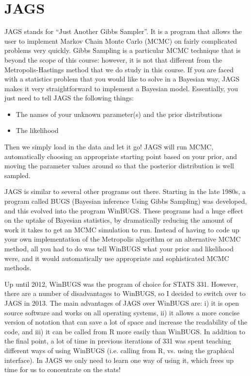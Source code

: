 \chapter{JAGS}
JAGS stands for ``Just Another Gibbs Sampler''. It is a program that allows the user
to implement Markov Chain Monte Carlo (MCMC) on fairly complicated problems
very quickly. Gibbs Sampling is a particular MCMC technique that is beyond the
scope of this course: however, it is not that different from the Metropolis-Hastings
method that we do study in this course. If you are faced with a statistics
problem that you would like to solve in a Bayesian way, JAGS makes it very
straightforward to implement a Bayesian model. Essentially, you just need to tell
JAGS the following things:
\begin{itemize}
\item The names of your unknown parameter(s) and the prior distributions
\item The likelihood
\end{itemize}
Then we simply load in the data and let it go! JAGS will run MCMC, automatically
choosing an appropriate starting point based on your prior, and moving the parameter
values around so that the posterior distribution is well sampled.

JAGS is similar to several other programs out there.
Starting in the late 1980s, a program called BUGS (Bayesian inference Using
Gibbs Sampling) was developed, and this evolved into the program WinBUGS. These
programs had a huge effect on the uptake of Bayesian statistics, by dramatically
reducing the amount of work it takes to get an MCMC simulation to run. Instead
of having to code up your own implementation of the Metropolis algorithm or
an alternative MCMC method, all you had to do was tell WinBUGS what your prior
and likelihood were, and it would automatically use appropriate and sophisticated
MCMC methods.

Up until 2012, WinBUGS was the
program of choice for STATS 331. However, there are a number of disadvantages to
WinBUGS, so I decided to switch over to JAGS in 2013. The main advantages of
JAGS over WinBUGS are: i) it is open source software and works on all
operating systems, ii) it allows a more concise version of notation that can
save a lot of space and increase the readability of the code, and iii) it can
be called from R more easily than WinBUGS. In addition to the
final point, a lot of time in previous iterations of 331 was spent teaching
different ways of using WinBUGS (i.e. calling from R, vs. using the graphical
interface). In JAGS we only need to learn one way of using
it, which frees up time for us to concentrate on the stats!

